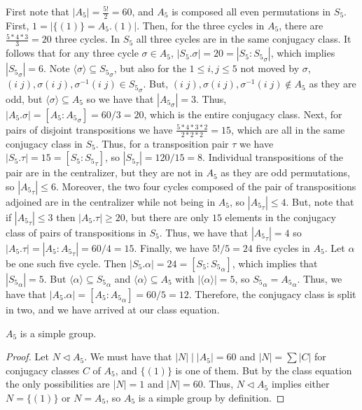 \documentclass[12pt, a4paper, oneside, openright, titlepage]{book}
\begin{document}
\begin{eg}
\begin{enumerate}
                        First note that $|A_5| = \frac{5!}{2} = 60$, and $A_5$ is composed all even permutations in $S_5$. First, $1 = |\{(1)\} = A_5.(1)|$. Then, for the three cycles in $A_5$, there are $\frac{5*4*3}{3} = 20$ three cycles. In $S_5$ all three cycles are in the same conjugacy class. It follows that for any three cycle $\sigma \in A_5$, $|S_5.\sigma| = 20 = |S_5:{S_5}_{\sigma}|$, which implies $|{S_5}_{\sigma}| = 6$. Note $\langle \sigma \rangle \subseteq {S_5}_{\sigma}$, but also for the $1 \leq i,j \leq 5$ not moved by $\sigma$, $(i\;j), \sigma(i\;j), \sigma^{-1}(i\;j) \in {S_5}_{\sigma}$. But, $(i\;j), \sigma(i\;j), \sigma^{-1}(i\;j) \notin A_5$ as they are odd, but $\langle \sigma \rangle \subseteq A_5$ so we have that $|{A_5}_{\sigma}| = 3$. Thus, $|A_5.\sigma| = [A_5:{A_5}_{\sigma}] = 60/3 = 20$, which is the entire conjugacy class. Next, for pairs of disjoint transpositions we have $\frac{5*4*3*2}{2*2*2} = 15$, which are all in the same conjugacy class in $S_5$. Thus, for a transposition pair $\tau$ we have $|S_5.\tau| = 15 = [S_5:{S_5}_{\tau}]$, so $|{S_5}_{\tau}| = 120/15 = 8$. Individual transpositions of the pair are in the centralizer, but they are not in $A_5$ as they are odd permutations, so $|{A_5}_{\tau}| \leq 6$. Moreover, the two four cycles composed of the pair of transpositions adjoined are in the centralizer while not being in $A_5$, so $|{A_5}_{\tau}| \leq 4$. But, note that if $|{A_5}_{\tau}| \leq 3$ then $|A_5.\tau| \geq 20$, but there are only $15$ elements in the conjugacy class of pairs of transpositions in $S_5$. Thus, we have that $|{A_5}_{\tau}| = 4$ so $|A_5.\tau| = |A_5:{A_5}_{\tau}| = 60/4 = 15$. Finally, we have $5!/5 =24$ five cycles in $A_5$. Let $\alpha$ be one such five cycle. Then $|S_5.\alpha| = 24 = [S_5:{S_5}_{\alpha}]$, which implies that $|{S_5}_{\alpha}| = 5$. But $\langle \alpha \rangle \subseteq {S_5}_{\alpha}$ and $\langle \alpha \rangle \subseteq A_5$ with $|\langle \alpha\rangle| = 5$, so ${S_5}_{\alpha} = {A_5}_{\alpha}$. Thus, we have that $|A_5.\alpha| = [A_5:{A_5}_{\alpha}] = 60/5 = 12$. Therefore, the conjugacy class is split in two, and we have arrived at our class equation.
        \end{enumerate}
\end{eg}

\begin{cor} 
        $A_5$ is a simple group.
\end{cor}
\begin{proof}
        Let $N \vartriangleleft A_5$. We must have that $|N|\;\vert\;|A_5| = 60$ and $|N| = \sum|C|$ for conjugacy classes $C$ of $A_5$, and $\{(1)\}$ is one of them. But by the class equation the only possibilities are $|N| = 1$ and $|N| = 60$. Thus, $N \vartriangleleft A_5$ implies either $N = \{(1)\}$ or $N = A_5$, so $A_5$ is a simple group by definition.
\end{proof}
\end{document}
